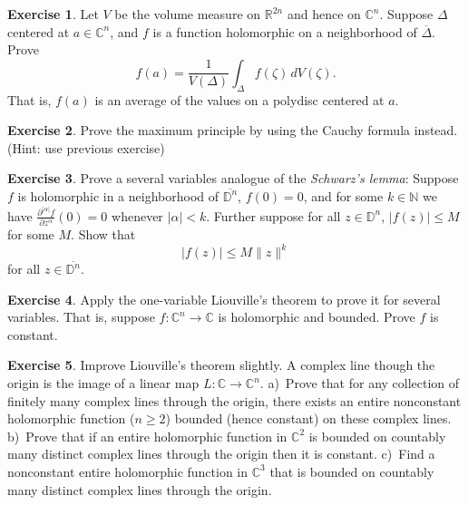 \documentclass[12pt,openany]{book}
\newcommand{\sabs}[1]{\lvert {#1} \rvert}
\newcommand{\snorm}[1]{\lVert {#1} \rVert}
\newcommand{\C}{{\mathbb{C}}}
\newcommand{\R}{{\mathbb{R}}}
\newcommand{\N}{{\mathbb{N}}}
\newcommand{\D}{{\mathbb{D}}}
\newcommand{\myindex}[1]{#1\index{#1}}
\theoremstyle{plain}
\theoremstyle{remark}
\theoremstyle{definition}
\newenvironment{exbox}{%
    \def\FrameCommand{\vrule width 1pt \relax\hspace {10pt}}%
    \MakeFramed {\advance \hsize -\width \FrameRestore }%
}{%
    \endMakeFramed
}
\theoremstyle{exercise}
\newtheorem{exercise}{Exercise}[section]
\theoremstyle{example}
\begin{document}
\begin{exbox}
\begin{exercise} \label{exercise:averageDelta}
Let $V$ be the volume measure on $\R^{2n}$ and hence on $\C^n$.
Suppose $\Delta$ centered at $a \in \C^n$, and $f$ is a function holomorphic on
a neighborhood of $\overline{\Delta}$.  Prove
\begin{equation*}
f(a) =
\frac{1}{V(\Delta)}
\int_{\Delta} f(\zeta) \, dV(\zeta) .
\end{equation*}
That is, $f(a)$ is an average of the values on a polydisc centered at $a$.
\end{exercise}

\begin{exercise}
Prove the maximum principle by using the Cauchy formula instead.  (Hint:
use previous exercise)
\end{exercise}

\begin{exercise}
Prove a several variables analogue of the \emph{\myindex{Schwarz's lemma}}:
Suppose $f$ is holomorphic in a neighborhood of $\overline{\D^n}$,
$f(0) = 0$, and for some $k \in \N$ we have
$\frac{\partial^{\sabs{\alpha}} f}{\partial z^\alpha} (0) =
0$ whenever $\sabs{\alpha} < k$.  Further suppose 
for all $z \in \D^n$,
$\sabs{f(z)} \leq M$ for some $M$.  Show that
\begin{equation*}
\sabs{f(z)} \leq M \snorm{z}^k
\end{equation*}
for all $z \in \overline{\D^n}$.
\end{exercise}

\begin{exercise}
Apply the one-variable Liouville's theorem to prove it for several variables.
That is, suppose $f \colon \C^n \to \C$ is holomorphic and bounded.
Prove $f$ is constant.
\end{exercise}

\begin{exercise}
Improve Liouville's theorem slightly.  A complex line though the origin is
the image of a linear map $L \colon \C \to \C^n$.  a)~Prove that 
for any collection of finitely many complex lines through the origin,
there exists an entire nonconstant holomorphic function ($n \geq 2$)
bounded (hence constant) on these complex lines.
b)~Prove that if an entire holomorphic function in $\C^2$ is bounded on
countably many distinct
complex lines through the origin then it is constant.
c)~Find a nonconstant entire holomorphic function in $\C^3$ that is
bounded on
countably many distinct
complex lines through the origin.
\end{exercise}


\end{exbox}
\end{document}
